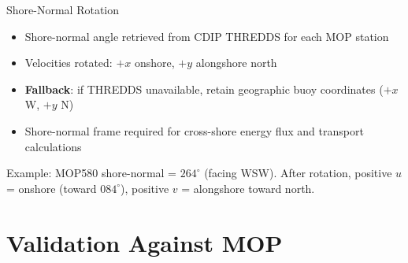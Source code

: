 \documentclass[10pt, aspectratio=169]{beamer}
\begin{document}
\begin{frame}{Shore-Normal Rotation}
  \begin{itemize}
    \item Shore-normal angle retrieved from CDIP THREDDS for each
          MOP station
    \item Velocities rotated: $+x$ onshore, $+y$ alongshore north
    \item \textbf{Fallback}: if THREDDS unavailable, retain
          geographic buoy coordinates ($+x$ W, $+y$ N)
    \item Shore-normal frame required for cross-shore energy flux
          and transport calculations
  \end{itemize}
  \vspace{0.5em}
  {\footnotesize
  Example: MOP580 shore-normal = $264^\circ$ (facing WSW).
  After rotation, positive $u$ = onshore (toward $084^\circ$),
  positive $v$ = alongshore toward north.}
\end{frame}


\section{Validation Against MOP}
\end{document}
